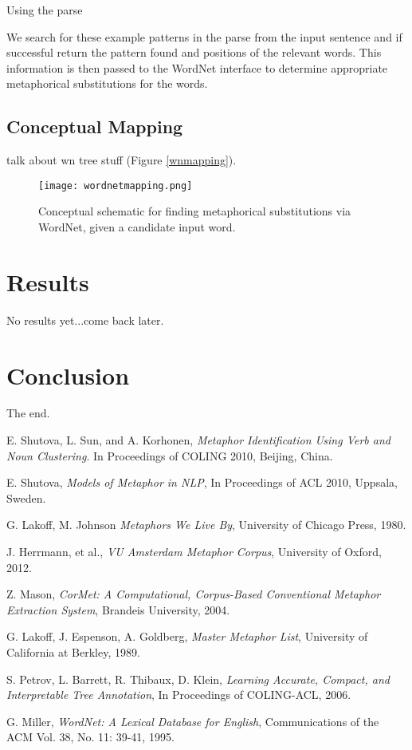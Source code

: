 \documentclass[12pt]{article}
\begin{document}
Using the parse 

We search for these example patterns in the parse from the input sentence and if successful return the pattern found and positions of the relevant words.  This information is then passed to the WordNet interface to determine appropriate metaphorical substitutions for the words.

\subsection{Conceptual Mapping}

talk about wn tree stuff (Figure \ref{wnmapping}).

\begin{figure}[h]
	\centering
	\texttt{[image: wordnetmapping.png]}
	\caption{Conceptual schematic for finding metaphorical substitutions via WordNet, given a candidate input word.}
	\label{fig:wnmapping}
\end{figure}

\section{Results}

No results yet...come back later.

\section{Conclusion}
The end.



\begin{thebibliography}{9}

  E. Shutova, L. Sun, and A. Korhonen,
  \emph{Metaphor Identification Using Verb and Noun Clustering}.
  In Proceedings of COLING 2010,
  Beijing, China.
  
  E. Shutova,
  \emph{Models of Metaphor in NLP},
  In Proceedings of ACL 2010,
  Uppsala, Sweden.
  
  G. Lakoff, M. Johnson
  \emph{Metaphors We Live By},
  University of Chicago Press, 1980.

  J. Herrmann, et al.,
  \emph{VU Amsterdam Metaphor Corpus},
  University of Oxford, 2012.

  Z. Mason,
  \emph{CorMet: A Computational, Corpus-Based Conventional Metaphor Extraction System},
  Brandeis University, 2004.

  G. Lakoff, J. Espenson, A. Goldberg,
  \emph{Master Metaphor List},
  University of California at Berkley, 1989.
  
  S. Petrov, L. Barrett, R. Thibaux, D. Klein,
  \emph{Learning Accurate, Compact, and Interpretable Tree Annotation},
  In Proceedings of COLING-ACL, 2006.

  G. Miller,
  \emph{WordNet: A Lexical Database for English},
  Communications of the ACM Vol. 38, No. 11: 39-41, 1995.

\end{thebibliography}
\end{document}
